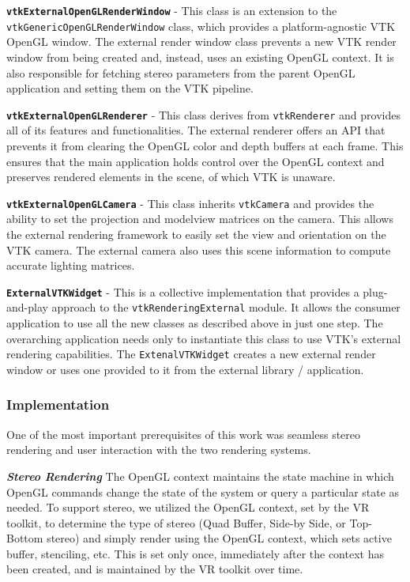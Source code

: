 \textbf{\texttt{vtkExternalOpenGLRenderWindow}} - This class is an extension to
the \texttt{vtkGenericOpenGLRenderWindow} class, which provides a
platform-agnostic VTK OpenGL window.
The external render window class prevents a new VTK render window from being
created and, instead, uses an existing OpenGL context.
It is also responsible for fetching stereo parameters from the parent OpenGL
application and setting them on the VTK pipeline.

\textbf{\texttt{vtkExternalOpenGLRenderer}} - This class derives from
\texttt{vtkRenderer} and provides all of its features and functionalities. The
external renderer offers an API that prevents it from clearing the OpenGL color
and depth buffers at each frame. This ensures that the main application holds
control over the OpenGL context and preserves rendered elements in the scene, of
which VTK is unaware.

\textbf{\texttt{vtkExternalOpenGLCamera}} - This class inherits
\texttt{vtkCamera} and provides the ability to set the projection and modelview
matrices on the camera. This allows the external rendering framework to easily
set the view and orientation on the VTK camera. The external camera also uses
this scene information to compute accurate lighting matrices.

\textbf{\texttt{ExternalVTKWidget}} - This is a collective implementation that
provides a plug-and-play approach to the \texttt{vtkRenderingExternal} module.
It allows the consumer application to use all the new classes as described above
in just one step. The overarching application needs only to instantiate this
class to use VTK's external rendering capabilities. The
\texttt{ExtenalVTKWidget} creates a new external render window or uses one
provided to it from the external library / application.

\subsubsection{Implementation}

One of the most important prerequisites of this work was seamless stereo rendering and user interaction with the two rendering systems. 

\textbf{\textit{Stereo Rendering}} The OpenGL context maintains the state machine in which OpenGL commands change the state of the system or query a particular state as needed.
To support stereo, we utilized the OpenGL context, set by the VR toolkit, to determine the type of stereo (Quad Buffer, Side-by Side, or Top-Bottom stereo) and simply render using the OpenGL context, which sets active buffer, stenciling, etc.
This is set only once, immediately after the context has been created, and is maintained by the VR toolkit over time. 

